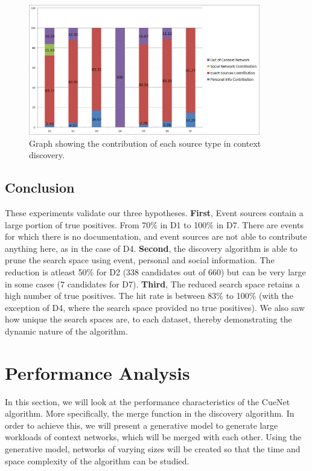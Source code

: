 \begin{figure}[t]
\centering
\includegraphics[width=0.9\textwidth]{media/discovery-distro-stacked-2.png}
\caption{Graph showing the contribution of each source type in context discovery.}
\label{fig:tag-distribution}
\end{figure}

\subsection{Conclusion}
These experiments validate our three hypotheses. \textbf{First}, Event sources contain a large portion of true positives. From 70\% in D1 to 100\% in D7. There are events for which there is no documentation, and event sources are not able to contribute anything here, as in the case of D4. \textbf{Second}, the discovery algorithm is able to prune the search space using event, personal and social information. The reduction is atleast 50\% for D2 (338 candidates out of 660) but can be very large in some cases (7 candidates for D7). \textbf{Third}, The reduced search space retains a high number of true positives. The hit rate is between 83\% to 100\% (with the exception of D4, where the search space provided no true positives). We also saw how unique the search spaces are, to each dataset, thereby demonstrating the dynamic nature of the algorithm.

\section{Performance Analysis}
In this section, we will look at the performance characteristics of the CueNet algorithm. More specifically, the merge function in the discovery algorithm. In order to achieve this, we will present a generative model to generate large workloads of context networks, which will be merged with each other. Using the generative model, networks of varying sizes will be created so that the time and space complexity of the algorithm can be studied.

